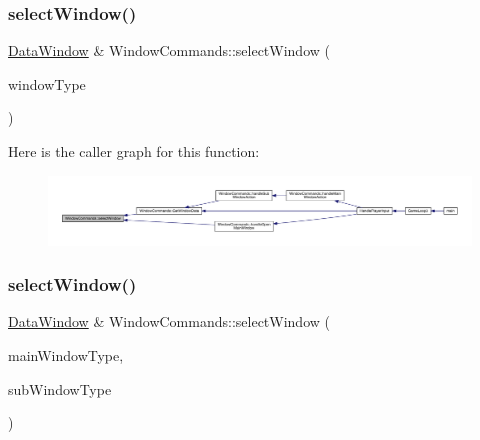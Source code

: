 \subsubsection{\texorpdfstring{select\+Window()}{selectWindow()}\hspace{0.1cm}{\footnotesize\ttfamily [1/2]}}
{\footnotesize\ttfamily \mbox{\hyperlink{class_data_window}{Data\+Window}} \& Window\+Commands\+::select\+Window (\begin{DoxyParamCaption}\item[{\mbox{\hyperlink{_data_window_8hpp_a3c1e0c6fe947fdbea7502497b27cf44d}{En\+Data\+Window\+Type}}}]{window\+Type }\end{DoxyParamCaption})}

Here is the caller graph for this function\+:
\nopagebreak
\begin{figure}[H]
\begin{center}
\leavevmode
\includegraphics[width=350pt]{class_window_commands_a4a688b109ea4eff83b5ae43bb1f93e50_icgraph}
\end{center}
\end{figure}
\mbox{\label{class_window_commands_a0e61beaebffb12c489ee277b84f74248}} 
\subsubsection{\texorpdfstring{select\+Window()}{selectWindow()}\hspace{0.1cm}{\footnotesize\ttfamily [2/2]}}
{\footnotesize\ttfamily \mbox{\hyperlink{class_data_window}{Data\+Window}} \& Window\+Commands\+::select\+Window (\begin{DoxyParamCaption}\item[{\mbox{\hyperlink{_data_window_8hpp_a3c1e0c6fe947fdbea7502497b27cf44d}{En\+Data\+Window\+Type}}}]{main\+Window\+Type,  }\item[{\mbox{\hyperlink{_data_window_8hpp_a3c1e0c6fe947fdbea7502497b27cf44d}{En\+Data\+Window\+Type}}}]{sub\+Window\+Type }\end{DoxyParamCaption})}

